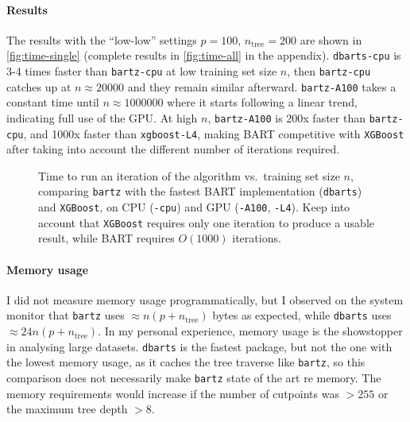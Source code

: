\documentclass{article}
\newcommand{\halfcenter}[1]{\noindent\hspace{-\columnwidth}\makebox[3\columnwidth][c]{#1}}
\newcommand{\includempl}[1]{\texttt{[image: \#1]}}
\let\oldmarginpar\marginpar
\renewcommand{\marginpar}[1]{\oldmarginpar{\sffamily\scriptsize #1}}
\renewcommand{\marginpar}[1]{\relax} %
\begin{document}
    \paragraph{Results}

    The results with the ``low-low'' settings $p=100$, $n_\text{tree}=200$ are shown in \autoref{fig:time-single} (complete results in \autoref{fig:time-all} in the appendix). \texttt{dbarts-cpu} is 3-4 times faster than \texttt{bartz-cpu} at low training set size $n$, then \texttt{bartz-cpu} catches up at $n\approx \num{20000}$ and they remain similar afterward. \texttt{bartz-A100} takes a constant time until $n \approx \num{1000000}$ where it starts following a linear trend, indicating full use of the GPU. At high $n$, \texttt{bartz-A100} is 200x faster than \texttt{bartz-cpu}, and 1000x faster than \texttt{xgboost-L4}, making BART competitive with \texttt{XGBoost} after taking into account the different number of iterations required.

    \begin{figure}
        \halfcenter{\includempl{time-single}}
        \caption{\label{fig:time-single} Time to run an iteration of the algorithm vs.\ training set size $n$, comparing \texttt{bartz} with the fastest BART implementation (\texttt{dbarts}) and \texttt{XGBoost}, on CPU (\texttt{-cpu}) and GPU (\texttt{-A100}, \texttt{-L4}). Keep into account that \texttt{XGBoost} requires only one iteration to produce a usable result, while BART requires $O(1000)$ iterations.}
    \end{figure}

    \paragraph{Memory usage}

    I did not measure memory usage programmatically, but I observed on the system monitor that \texttt{bartz} uses $\approx n(p+n_\text{tree})$ bytes as expected, while \texttt{dbarts} uses $\approx 24 n(p+n_\text{tree})$. In my personal experience, memory usage is the showstopper in analysing large datasets.\marginpar{someone in the literature said the same, but I can't remember who} \texttt{dbarts} is the fastest package, but not the one with the lowest memory usage, as it caches the tree traverse like \texttt{bartz}, so this comparison does not necessarily make \texttt{bartz} state of the art re memory. The memory requirements would increase if the number of cutpoints was $>255$ or the maximum tree depth $>8$.
\end{document}
